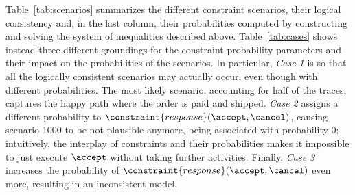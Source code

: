\begin{example}
Table~\ref{tab:scenarios} summarizes the different constraint scenarios, their logical consistency and, in the last column, their probabilities computed by constructing and solving the system of inequalities described above.
Table~\ref{tab:cases} shows instead three different groundings for the constraint probability parameters and their impact on the probabilities of the scenarios. In particular, \emph{Case 1} is so that all the logically consistent scenarios may actually occur, even though with different probabilities. The most likely scenario, accounting for half of the traces, captures the happy path where the order is paid and shipped.
\emph{Case 2} assigns a different probability to $\constraint{response}(\accept,\cancel)$, causing scenario $1000$ to be not plausible anymore, being associated with probability $0$; intuitively, the interplay of constraints and their probabilities makes it impossible to just execute $\accept$ without taking further activities.
Finally, \emph{Case 3} increases the probability of $\constraint{response}(\accept,\cancel)$ even more, resulting in an inconsistent model.





\end{example}

